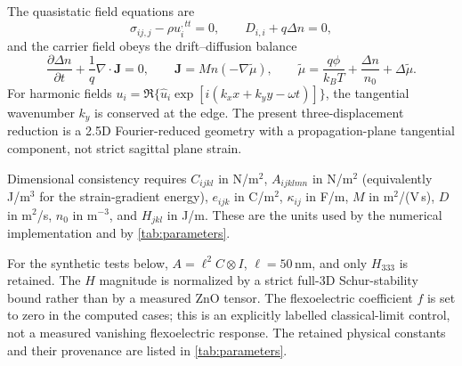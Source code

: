 The quasistatic field equations are
\[
\sigma_{ij,j}-\rho u_i^{,tt}=0,
\qquad
D_{i,i}+q\Delta n=0,
\]
and the carrier field obeys the drift--diffusion balance
\[
\frac{\partial\Delta n}{\partial t}
+\frac1q\nabla\!\cdot\!\mathbf J
=0,
\qquad
\mathbf J=M n\left(-\nabla\widetilde{\mu}\right),
\qquad
\widetilde{\mu}=\frac{q\phi}{k_BT}+\frac{\Delta n}{n_0}+\Delta\widetilde{\mu}.
\]
For harmonic fields \(u_i=\Re\{\hat u_i\exp[i(k_xx+k_yy-\omega t)]\}\), the
tangential wavenumber \(k_y\) is conserved at the edge. The present three-displacement
reduction is a 2.5D Fourier-reduced geometry with a propagation-plane tangential
component, not strict sagittal plane strain.

Dimensional consistency requires \(C_{ijkl}\) in N/m\(^2\), \(A_{ijklmn}\) in
N/m\(^2\) (equivalently J/m\(^3\) for the strain-gradient energy), \(e_{ijk}\) in
C/m\(^2\), \(\kappa_{ij}\) in F/m, \(M\) in m\(^2\)/(V\,s), \(D\) in m\(^2\)/s,
\(n_0\) in m\(^{-3}\), and \(H_{jkl}\) in J/m. These are the units used by the
numerical implementation and by \cref{tab:parameters}.

For the synthetic tests below, \(A=\ell^2C\otimes I\), \(\ell=50\,\)nm, and only
\(H_{333}\) is retained. The \(H\) magnitude is normalized by a strict full-3D
Schur-stability bound rather than by a measured ZnO tensor. The flexoelectric
coefficient \(f\) is set to zero in the computed cases; this is an explicitly
labelled classical-limit control, not a measured vanishing flexoelectric response.
The retained physical constants and their provenance are listed in
\cref{tab:parameters}.
